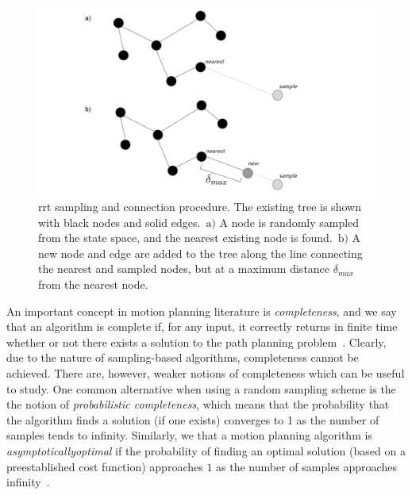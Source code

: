 \begin{figure}
    \begin{center}
        \includegraphics[width=\textwidth]{./figures/RRT_figure.pdf}
    \end{center}
    \caption[RRT sampling and connection procedure]{\gls{rrt} sampling and connection procedure. The existing tree is shown with black nodes and solid edges.\ $\text{a}\rparen$ A node is randomly sampled from the state space, and the nearest existing node is found.\ $\text{b}\rparen$ A new node and edge are added to the tree along the line connecting the nearest and sampled nodes, but at a maximum distance $\delta_{max}$ from the nearest node.}
\label{rrt}
\end{figure}

An important concept in motion planning literature is {\em completeness}, and we say that an algorithm is complete if, for any input, it correctly returns in finite time whether or not there exists a solution to the path planning problem~\cite{LaValle2006}. Clearly, due to the nature of sampling-based algorithms, completeness cannot be achieved. There are, however, weaker notions of completeness which can be useful to study. One common alternative when using a random sampling scheme is the the notion of {\em probabilistic completeness}, which means that the probability that the algorithm finds a solution (if one exists) converges to 1 as the number of samples tends to infinity. Similarly, we that a motion planning algorithm is {\em asymptotically\/optimal} if the probability of finding an optimal solution (based on a preestablished cost function) approaches $1$ as the number of samples approaches infinity~\cite{Karaman2011}.




